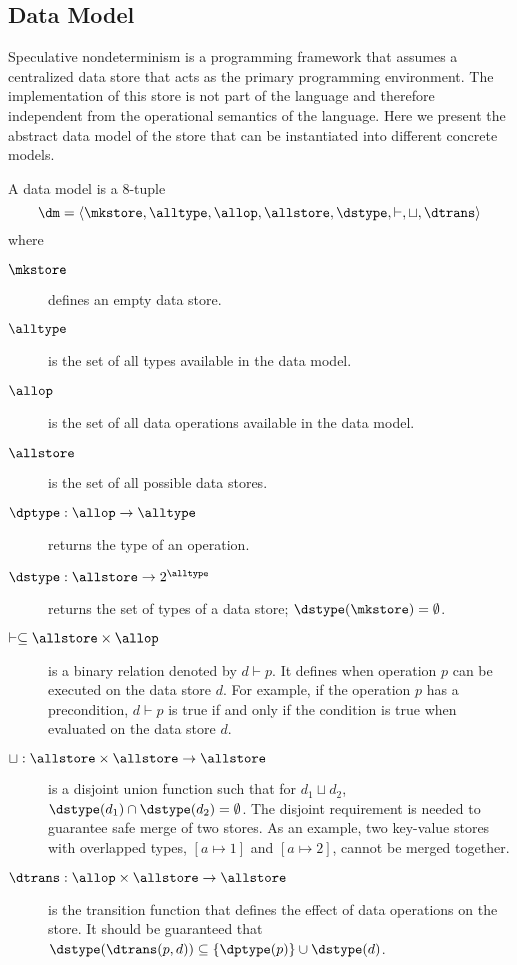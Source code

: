 \subsection{Data Model}\label{sec:datamodel}

Speculative nondeterminism is a programming framework that assumes a centralized
data store that acts as the primary programming environment. The implementation of this store is
not part of the language and therefore independent from the operational semantics of the language.
Here we present the abstract data model of the store that can be instantiated into different
concrete models.

A data model is a 8-tuple
$$\dm=\langle\mkstore,\alltype,\allop,\allstore,\dstype,\vdash,\sqcup,\dtrans\rangle$$
where
\begin{description}
  \item[$\mkstore$] defines an empty data store.
  \item[$\alltype$] is the set of all types available in the data model.
  \item[$\allop$] is the set of all data operations available in the data model.
  \item[$\allstore$] is the set of all possible data stores.
  \item[$\dptype:\allop\to\alltype$] returns the type of an operation.
  \item[$\dstype:\allstore\to 2^\alltype$] returns the set of types of a data store; $\dstype(\mkstore)=\emptyset$.
  \item[$\vdash\subseteq\allstore\times\allop$] is a binary relation
denoted by $d\vdash p$.
It defines when operation $p$ can be executed on the data store $d$.
For example, if the operation $p$ has a precondition, $d\vdash p$ is
true if and only if the condition is true when evaluated on the data store $d$.
  \item[$\sqcup:\allstore\times\allstore\to\allstore$] is a disjoint union function
such that for $d_1\sqcup d_2$, $\dstype(d_1)\cap\dstype(d_2)=\emptyset$.
The disjoint requirement is needed to guarantee safe merge of two stores.
As an example, two key-value stores with overlapped types,
$[a\mapsto 1]$ and $[a\mapsto 2]$, cannot be merged together.
  \item[$\dtrans:\allop\times\allstore\to\allstore$] is the transition function that
defines the effect of data operations on the store. 
It should be guaranteed that $\dstype(\dtrans(p,d))\subseteq\{\dptype(p)\}\cup\dstype(d)$. 
\end{description}

